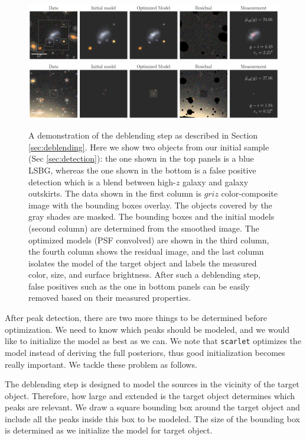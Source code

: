 \documentclass[twocolumn,astrosymb,twocolappendix]{aastex631}
\newcommand{\code}[1]{\texttt{#1}}
\begin{document}
\begin{CJK*}{UTF8}{gbsn}
\begin{figure}
	\vbox{ 
		\centering
		\includegraphics[width=1\linewidth]{vanilla_scarlet_demo.pdf}
		\includegraphics[width=1\linewidth]{vanilla_scarlet_demo2.pdf}
	}
	\caption{A demonstration of the deblending step as described in Section \ref{sec:deblending}. Here we show two objects from our initial sample (Sec \ref{sec:detection}): the one shown in the top panels is a blue LSBG, whereas the one shown in the bottom is a false positive detection which is a blend between high-$z$ galaxy and galaxy outskirts. The data shown in the first column is $griz$ color-composite image with the bounding boxes overlay. The objects covered by the gray shades are masked. The bounding boxes and the initial models (second column) are determined from the smoothed image. The optimized models (PSF convolved) are shown in the third column, the fourth column shows the residual image, and the last column isolates the model of the target object and labels the measured color, size, and surface brightness. After such a deblending step, false positives such as the one in bottom panels can be easily removed based on their measured properties. 
	}
	\label{fig:vanilla_scarlet_demo}
\end{figure}

After peak detection, there are two more things to be determined before optimization. We need to know which peaks should be modeled, and we would like to initialize the model as best as we can. We note that \code{scarlet} optimizes the model instead of deriving the full posteriors, thus good initialization becomes really important. We tackle these problem as follows. 

The deblending step is designed to model the sources in the vicinity of the target object. Therefore, how large and extended is the target object determines which peaks are relevant. We draw a square bounding box around the target object and include all the peaks inside this box to be modeled. The size of the bounding box is determined as we initialize the model for target object.


\end{CJK*}
\end{document}
